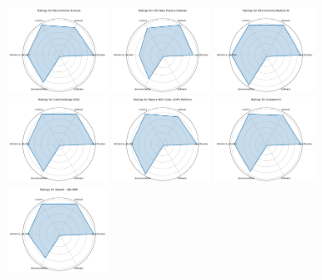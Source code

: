 \documentclass{article}
\begin{document}
\begin{figure}[ht!]
\centering
\includegraphics[width=0.2333\textwidth]{MLCommons Science_radar.pdf}
\includegraphics[width=0.2333\textwidth]{LHC New Physics Dataset_radar.pdf}
\includegraphics[width=0.2333\textwidth]{MLCommons Medical AI_radar.pdf}
\\[1ex]
\includegraphics[width=0.2333\textwidth]{CaloChallenge 2022_radar.pdf}
\includegraphics[width=0.2333\textwidth]{Papers With Code- SOTA Platform_radar.pdf}
\includegraphics[width=0.2333\textwidth]{Codabench_radar.pdf}
\\[1ex]
\includegraphics[width=0.2333\textwidth]{Sabath - SBI-FAIR_radar.pdf}

\end{figure}
\end{document}
